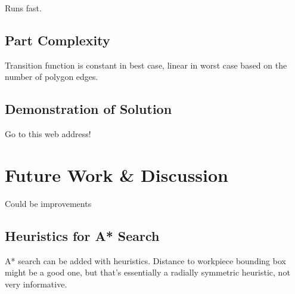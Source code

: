 Runs fast.

	\subsection{Part Complexity}

Transition function is constant in best case, linear in worst case based on the number of polygon edges.

	\subsection{Demonstration of Solution}

Go to this web address!

\section{Future Work \& Discussion}

Could be improvements

	\subsection{Heuristics for A* Search}

A* search can be added with heuristics. Distance to workpiece bounding box might be a good one, but that's essentially a radially symmetric heuristic, not very informative.
